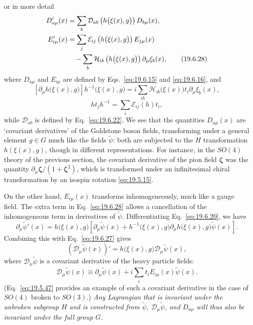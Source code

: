 or in more detail
\begin{align}
D'_{a\mu}(x)
&=\sum_b\mathcal D_{ab}
\left(h\bigl(\xi(x),g\bigr)\right)D_{b\mu}(x),
\notag\\
E'_{i\mu}(x)
&=\sum_j\mathcal E_{ij}
\left(h\bigl(\xi(x),g\bigr)\right)E_{j\mu}(x)
\notag\\
&\quad-\sum_b\mathcal H_{ib}
\left(h\bigl(\xi(x),g\bigr)\right)\partial_\mu\xi_b(x),
\tag{19.6.28}\label{eq:19.6.28}
\end{align}
where $D_{a\mu}$ and $E_{i\mu}$ are defined by Eqs.~\eqref{eq:19.6.15} and \eqref{eq:19.6.16}, and
\[
\left[\partial_\mu h\bigl(\xi(x),g\bigr)\right]
h^{-1}\bigl(\xi(x),g\bigr)
=i\sum_{ib}\mathcal H_{ib}\bigl(\xi(x)\bigr)
t_i\partial_\mu\xi_b(x),
\]
\[
ht_jh^{-1}=\sum_i\mathcal E_{ij}(h)t_i,
\]
while $\mathcal D_{ab}$ is defined by Eq.~\eqref{eq:19.6.22}. We see that the quantities $D_{a\mu}(x)$ are `covariant derivatives' of the Goldstone boson fields, transforming under a general element $g\in G$ much like the fields $\widetilde\psi$: both are subjected to the $H$ transformation $h(\xi(x),g)$, though in different representations. For instance, in the $SO(4)$ theory of the previous section, the covariant derivative of the pion field $\boldsymbol\zeta$ was the quantity $\partial_\mu\boldsymbol\zeta/(1+\boldsymbol\zeta^2)$, which is transformed under an infinitesimal chiral transformation by an isospin rotation \eqref{eq:19.5.15}.

On the other hand, $E_{i\mu}(x)$ transforms inhomogeneously, much like a gauge field. The extra term in Eq.~\eqref{eq:19.6.28} allows a cancellation of the inhomogeneous term in derivatives of $\widetilde\psi$. Differentiating Eq.~\eqref{eq:19.6.20}, we have
\[
\partial_\mu\widetilde\psi'(x)
=h\bigl(\xi(x),g\bigr)\left[
\partial_\mu\widetilde\psi(x)
+h^{-1}\bigl(\xi(x),g\bigr)
\partial_\mu h\bigl(\xi(x),g\bigr)\widetilde\psi(x)
\right].
\]
Combining this with Eq.~\eqref{eq:19.6.27} gives
\begin{equation}
\left(\mathcal D_\mu\widetilde\psi(x)\right)'
=h\bigl(\xi(x),g\bigr)\mathcal D_\mu\widetilde\psi(x),
\tag{19.6.29}\label{eq:19.6.29}
\end{equation}
where $\mathcal D_\mu\widetilde\psi$ is a covariant derivative of the heavy particle fields:
\begin{equation}
\mathcal D_\mu\widetilde\psi(x)
\equiv\partial_\mu\widetilde\psi(x)
+i\sum_i t_iE_{i\mu}(x)\widetilde\psi(x).
\tag{19.6.30}\label{eq:19.6.30}
\end{equation}
(Eq.~\eqref{eq:19.5.47} provides an example of such a covariant derivative in the case of $SO(4)$ broken to $SO(3)$.) \emph{Any Lagrangian that is invariant under the unbroken subgroup $H$ and is constructed from $\widetilde\psi$, $\mathcal D_\mu\widetilde\psi$, and $D_{a\mu}$ will thus also be invariant under the full group $G$.}


